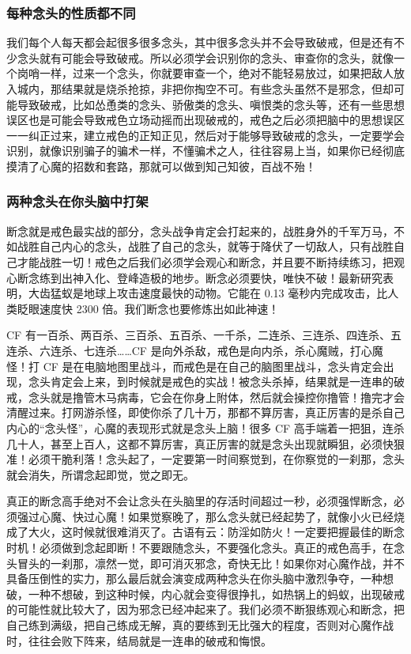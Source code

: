 \subsubsection{每种念头的性质都不同}

我们每个人每天都会起很多很多念头，其中很多念头并不会导致破戒，但是还有不少念头就有可能会导致破戒。所以必须学会识别你的念头、审查你的念头，就像一个岗哨一样，过来一个念头，你就要审查一个，绝对不能轻易放过，如果把敌人放入城内，那结果就是烧杀抢掠，非把你掏空不可。有些念头虽然不是邪念，但却可能导致破戒，比如怂恿类的念头、骄傲类的念头、嗔恨类的念头等，还有一些思想误区也是可能会导致戒色立场动摇而出现破戒的，戒色之后必须把脑中的思想误区一一纠正过来，建立戒色的正知正见，然后对于能够导致破戒的念头，一定要学会识别，就像识别骗子的骗术一样，不懂骗术之人，往往容易上当，如果你已经彻底摸清了心魔的招数和套路，那就可以做到知己知彼，百战不殆！

\subsubsection{两种念头在你头脑中打架}

断念就是戒色最实战的部分，念头战争肯定会打起来的，战胜身外的千军万马，不如战胜自己内心的念头，战胜了自己的念头，就等于降伏了一切敌人，只有战胜自己才能战胜一切！戒色之后我们必须学会观心和断念，并且要不断持续练习，把观心断念练到出神入化、登峰造极的地步。断念必须要快，唯快不破！最新研究表明，大齿猛蚁是地球上攻击速度最快的动物。它能在 0.13 毫秒内完成攻击，比人类眨眼速度快 2300 倍。我们断念也要修炼出如此神速！

CF 有一百杀、两百杀、三百杀、五百杀、一千杀，二连杀、三连杀、四连杀、五连杀、六连杀、七连杀……CF 是向外杀敌，戒色是向内杀，杀心魔贼，打心魔怪！打 CF 是在电脑地图里战斗，而戒色是在自己的脑图里战斗，念头肯定会出现，念头肯定会上来，到时候就是戒色的实战！被念头杀掉，结果就是一连串的破戒，念头就是撸管木马病毒，它会在你身上附体，然后就会操控你撸管！撸完才会清醒过来。打网游杀怪，即使你杀了几十万，那都不算厉害，真正厉害的是杀自己内心的“念头怪”，心魔的表现形式就是念头上脑！很多 CF 高手端着一把狙，连杀几十人，甚至上百人，这都不算厉害，真正厉害的就是念头出现就瞬狙，必须快狠准！必须干脆利落！念头起了，一定要第一时间察觉到，在你察觉的一刹那，念头就会消失，所谓念起即觉，觉之即无。

真正的断念高手绝对不会让念头在头脑里的存活时间超过一秒，必须强悍断念，必须强过心魔、快过心魔！如果觉察晚了，那么念头就已经起势了，就像小火已经烧成了大火，这时候就很难消灭了。古语有云：防淫如防火！一定要把握最佳的断念时机！必须做到念起即断！不要跟随念头，不要强化念头。真正的戒色高手，在念头冒头的一刹那，凛然一觉，即可消灭邪念，奇快无比！如果你对心魔作战，并不具备压倒性的实力，那么最后就会演变成两种念头在你头脑中激烈争夺，一种想破，一种不想破，到这种时候，内心就会变得很挣扎，如热锅上的蚂蚁，出现破戒的可能性就比较大了，因为邪念已经冲起来了。我们必须不断狠练观心和断念，把自己练到满级，把自己练成无解，真的要练到无比强大的程度，否则对心魔作战时，往往会败下阵来，结局就是一连串的破戒和悔恨。

